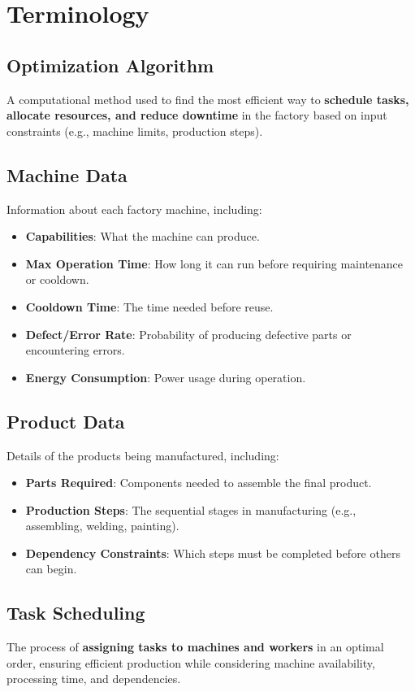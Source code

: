 \section{Terminology}
\label{section:terminology}

\subsection{Optimization Algorithm}
A computational method used to find the most efficient way to \textbf{schedule tasks, allocate resources, and reduce downtime} in the factory based on input constraints (e.g., machine limits, production steps).  

\subsection{Machine Data}
Information about each factory machine, including:  
\begin{itemize}
    \item \textbf{Capabilities}: What the machine can produce.
    \item \textbf{Max Operation Time}: How long it can run before requiring maintenance or cooldown.
    \item \textbf{Cooldown Time}: The time needed before reuse.
    \item \textbf{Defect/Error Rate}: Probability of producing defective parts or encountering errors.
    \item \textbf{Energy Consumption}: Power usage during operation.
\end{itemize}

\subsection{Product Data}
Details of the products being manufactured, including:  
\begin{itemize}
    \item \textbf{Parts Required}: Components needed to assemble the final product.
    \item \textbf{Production Steps}: The sequential stages in manufacturing (e.g., assembling, welding, painting).
    \item \textbf{Dependency Constraints}: Which steps must be completed before others can begin.
\end{itemize}

\subsection{Task Scheduling}
The process of \textbf{assigning tasks to machines and workers} in an optimal order, ensuring efficient production while considering machine availability, processing time, and dependencies.

